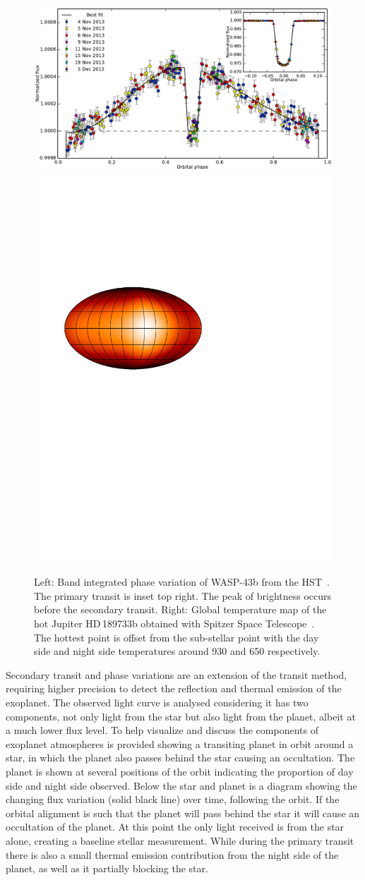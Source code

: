 \begin{figure}
    \centering
    \includegraphics[width=0.5\linewidth]{figures/introduction/stevenson_phasecurve2014.pdf}
    \includegraphics[width=0.4\linewidth]{figures/introduction/knutson_2007_temperature_map_HD_189733b.pdf}
    \caption{Left: Band integrated phase variation of {WASP-43b} from the HST~\citep{stevenson_thermal_2014}. The primary transit is inset top right.
        The peak of brightness occurs before the secondary transit.
        Right: Global temperature map of the hot Jupiter HD\,189733b obtained with {Spitzer Space Telescope}~\citep{knutson_map_2007}. The hottest point is offset from the sub-stellar point with the day side and night side temperatures around 930\K{} and 650\K{} respectively.}
    \label{fig:phasecurve_and_temp_map}
\end{figure}

Secondary transit and phase variations are an extension of the transit method, requiring higher precision to detect the reflection and thermal emission of the exoplanet. The observed light curve is analysed considering it has two components, not only light from the star but also light from the planet, albeit at a much lower flux level.
To help visualize and discuss the components of exoplanet atmospheres  is provided showing a transiting planet in orbit around a star, in which the planet also passes behind the star causing an occultation. The planet is shown at several positions of the orbit indicating the proportion of day side and night side observed. Below the star and planet is a diagram showing the changing flux variation (solid black line) over time, following the orbit. If the orbital alignment is such that the planet will pass behind the star it will cause an occultation of the planet. At this point the only light received is from the star alone, creating a baseline stellar measurement. While during the primary transit there is also a small thermal emission contribution from the night side of the planet, as well as it partially blocking the star.

